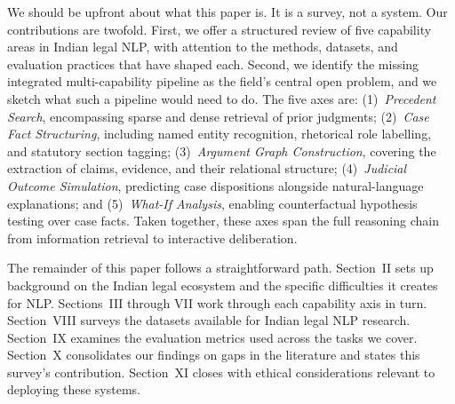 We should be upfront about what this paper is. It is a survey, not a system. Our contributions are twofold. First, we offer a structured review of five capability areas in Indian legal NLP, with attention to the methods, datasets, and evaluation practices that have shaped each. Second, we identify the missing integrated multi-capability pipeline as the field's central open problem, and we sketch what such a pipeline would need to do. The five axes are: (1)~\emph{Precedent Search}, encompassing sparse and dense retrieval of prior judgments; (2)~\emph{Case Fact Structuring}, including named entity recognition, rhetorical role labelling, and statutory section tagging; (3)~\emph{Argument Graph Construction}, covering the extraction of claims, evidence, and their relational structure; (4)~\emph{Judicial Outcome Simulation}, predicting case dispositions alongside natural-language explanations; and (5)~\emph{What-If Analysis}, enabling counterfactual hypothesis testing over case facts. Taken together, these axes span the full reasoning chain from information retrieval to interactive deliberation.

The remainder of this paper follows a straightforward path. Section~II sets up background on the Indian legal ecosystem and the specific difficulties it creates for NLP. Sections~III through VII work through each capability axis in turn. Section~VIII surveys the datasets available for Indian legal NLP research. Section~IX examines the evaluation metrics used across the tasks we cover. Section~X consolidates our findings on gaps in the literature and states this survey's contribution. Section~XI closes with ethical considerations relevant to deploying these systems.

